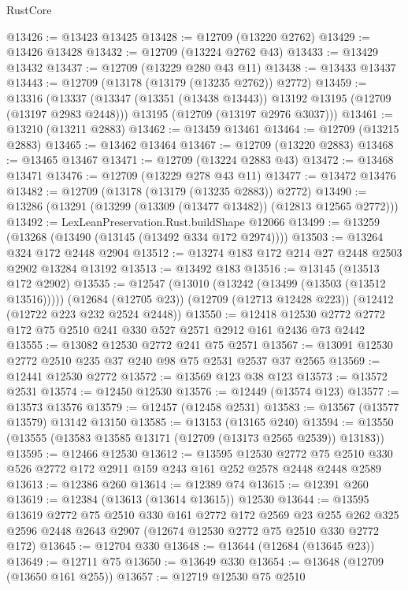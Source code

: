 \begin{lexlean}{RustCore}
\begin{coremodule}
@13426 := @13423 @13425
@13428 := @12709 (@13220 @2762)
@13429 := @13426 @13428
@13432 := @12709 (@13224 @2762 @43)
@13433 := @13429 @13432
@13437 := @12709 (@13229 @280 @43 @11)
@13438 := @13433 @13437
@13443 := @12709 (@13178 (@13179 (@13235 @2762)) @2772)
@13459 := @13316
    (@13337
      (@13347 (@13351 (@13438 @13443)) @13192 @13195 (@12709 (@13197 @2983 @2448)))
      @13195
      (@12709 (@13197 @2976 @3037)))
@13461 := @13210 (@13211 @2883)
@13462 := @13459 @13461
@13464 := @12709 (@13215 @2883)
@13465 := @13462 @13464
@13467 := @12709 (@13220 @2883)
@13468 := @13465 @13467
@13471 := @12709 (@13224 @2883 @43)
@13472 := @13468 @13471
@13476 := @12709 (@13229 @278 @43 @11)
@13477 := @13472 @13476
@13482 := @12709 (@13178 (@13179 (@13235 @2883)) @2772)
@13490 := @13286 (@13291 (@13299 (@13309 (@13477 @13482)) (@12813 @12565 @2772)))
@13492 := LexLeanPreservation.Rust.buildShape @12066
@13499 := @13259 (@13268 (@13490 (@13145 (@13492 @334 @172 @2974))))
@13503 := @13264 @324 @172 @2448 @2904
@13512 := @13274 @183 @172 @214 @27 @2448 @2503 @2902 @13284 @13192
@13513 := @13492 @183
@13516 := @13145 (@13513 @172 @2902)
@13535 := @12547
    (@13010 (@13242 (@13499 (@13503 (@13512 @13516)))))
    (@12684 (@12705 @23))
    (@12709 (@12713 @12428 @223))
    (@12412 (@12722 @223 @232 @2524 @2448))
@13550 := @12418 @12530 @2772 @2772 @172 @75 @2510 @241 @330 @527 @2571 @2912 @161 @2436 @73 @2442
@13555 := @13082 @12530 @2772 @241 @75 @2571
@13567 := @13091 @12530 @2772 @2510 @235 @37 @240 @98 @75 @2531 @2537 @37 @2565
@13569 := @12441 @12530 @2772
@13572 := @13569 @123 @38 @123
@13573 := @13572 @2531
@13574 := @12450 @12530
@13576 := @12449 (@13574 @123)
@13577 := @13573 @13576
@13579 := @12457 (@12458 @2531)
@13583 := @13567 (@13577 @13579) @13142 @13150
@13585 := @13153 (@13165 @240)
@13594 := @13550 (@13555 (@13583 @13585 @13171 (@12709 (@13173 @2565 @2539)) @13183))
@13595 := @12466 @12530
@13612 := @13595
    @12530
    @2772
    @75
    @2510
    @330
    @526
    @2772
    @172
    @2911
    @159
    @243
    @161
    @252
    @2578
    @2448
    @2448
    @2589
@13613 := @12386 @260
@13614 := @12389 @74
@13615 := @12391 @260
@13619 := @12384 (@13613 (@13614 @13615)) @12530
@13644 := @13595
    @13619
    @2772
    @75
    @2510
    @330
    @161
    @2772
    @172
    @2569
    @23
    @255
    @262
    @325
    @2596
    @2448
    @2643
    @2907
    (@12674 @12530 @2772 @75 @2510 @330 @2772 @172)
@13645 := @12704 @330
@13648 := @13644 (@12684 (@13645 @23))
@13649 := @12711 @75
@13650 := @13649 @330
@13654 := @13648 (@12709 (@13650 @161 @255))
@13657 := @12719 @12530 @75 @2510

\end{coremodule}
\end{lexlean}

